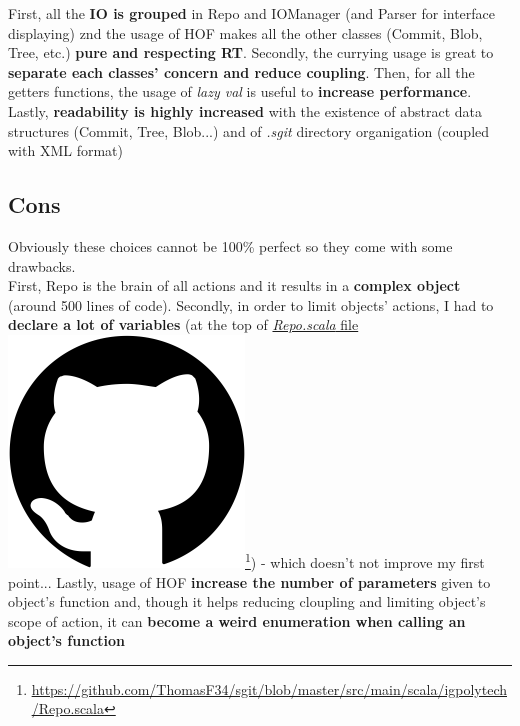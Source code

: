 \documentclass[11pt]{article}
\begin{document}
First, all the \textbf{IO is grouped} in Repo and IOManager (and Parser for interface displaying) znd the usage of HOF makes all the other classes (Commit, Blob, Tree, etc.) \textbf{pure and respecting RT}.
Secondly, the currying usage is great to \textbf{separate each classes' concern and reduce coupling}.
Then, for all the getters functions, the usage of \textit{lazy val} is useful to \textbf{increase performance}.
Lastly, \textbf{readability is highly increased} with the existence of abstract data structures (Commit, Tree, Blob...) and of \textit{.sgit} directory organigation (coupled with XML format)


\subsection{Cons}
Obviously these choices cannot be 100\% perfect so they come with some drawbacks.\\

First, Repo is the brain of all actions and it results in a \textbf{complex object} (around 500 lines of code).
Secondly, in order to limit objects' actions, I had to \textbf{declare a lot of variables} (at the top of \href{https://github.com/ThomasF34/sgit/blob/master/src/main/scala/igpolytech/Repo.scala}{\textit{Repo.scala} file \includegraphics[height=\fontcharht\font`\l]{img/github.png}}\footnote{\href{https://github.com/ThomasF34/sgit/blob/master/src/main/scala/igpolytech/Repo.scala}{\ul{https://github.com/ThomasF34/sgit/blob/master/src/main/scala/igpolytech/Repo.scala}}}) - which doesn't not improve my first point...
Lastly, usage of HOF \textbf{increase the number of parameters} given to object's function and, though it helps reducing cloupling and limiting object's scope of action, it can \textbf{become a weird enumeration when calling an object's function}
\end{document}
